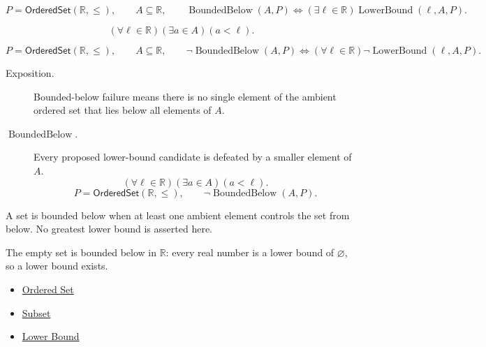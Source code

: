 \begin{remark*}
\[
  P=\mathsf{OrderedSet}(\mathbb{R},\leq),\qquad A\subseteq\mathbb{R},\qquad
  \operatorname{BoundedBelow}(A,P)
  \Longleftrightarrow
  (\exists \ell\in\mathbb{R})\operatorname{LowerBound}(\ell,A,P).
\]
\end{remark*}

\begin{remark*}
\[
  (\forall \ell\in\mathbb{R})(\exists a\in A)(a<\ell).
\]
\end{remark*}

\begin{remark*}
\[
  P=\mathsf{OrderedSet}(\mathbb{R},\leq),\qquad A\subseteq\mathbb{R},\qquad
  \neg\operatorname{BoundedBelow}(A,P)
  \Longleftrightarrow
  (\forall \ell\in\mathbb{R})\neg\operatorname{LowerBound}(\ell,A,P).
\]
\end{remark*}

\begin{remark*}
\begin{description}
  \item[Exposition.]
  Bounded-below failure means there is no single element of the ambient
  ordered set that lies below all elements of $A$.

  \item[\(\operatorname{BoundedBelow}.\)]
  Every proposed lower-bound candidate is defeated by a smaller element of $A$.
  \[
    (\forall \ell\in\mathbb{R})(\exists a\in A)(a<\ell).
  \]
  \[
    P=\mathsf{OrderedSet}(\mathbb{R},\leq),\qquad
    \neg\operatorname{BoundedBelow}(A,P).
  \]
\end{description}
\end{remark*}

\begin{remark*}[Interpretation]
A set is bounded below when at least one ambient element controls the set
from below.  No greatest lower bound is asserted here.
\end{remark*}

\begin{remark*}[Exposition]
The empty set is bounded below in $\mathbb{R}$: every real number is a lower
bound of $\varnothing$, so a lower bound exists.
\end{remark*}

\begin{dependencies}
\begin{itemize}
  \item \hyperref[def:ordered-set]{Ordered Set}
  \item \hyperref[def:subset]{Subset}
  \item \hyperref[def:real-lower-bound]{Lower Bound}
\end{itemize}
\end{dependencies}


